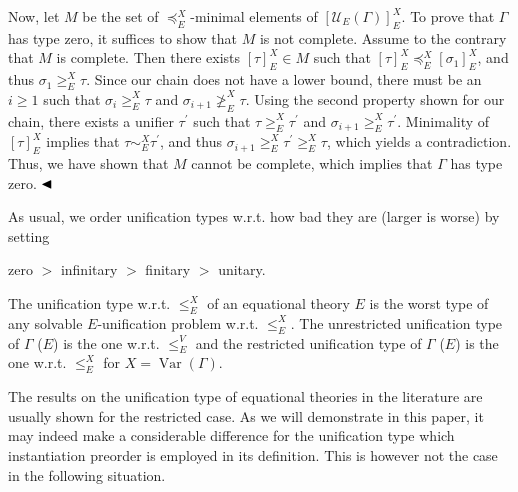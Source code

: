 \documentclass[10pt,a4paper]{amsart}
\begin{document}
 
  
Now, let $M$ be the set of $\preceq_{E}^{X}$-minimal elements of $[\mathcal{U}_{E}(\Gamma)]_{E}^{X}$. To prove that $\Gamma$ has type zero, it suffices to show that $M$ is not complete. Assume to the contrary that $M$ is complete. Then there exists $[\tau]^{X}_{E}\in M$ such that $[\tau]^{X}_{E}\preceq_{E}^{X}[\sigma_{1}]^{X}_{E}$, and thus $\sigma_{1}\geq_{E}^{X}\tau$. Since our chain does not have a lower bound, there must be an $i\geq 1$ such that $\sigma_{i}\geq_{E}^{X}\tau$ and $\sigma_{i+1}\not\geq_{E}^{X}\tau$. Using the second property shown for our chain, there exists a unifier $\tau^{\prime}$ such that $\tau\geq_{E}^{X}\tau^{\prime}$ and $\sigma_{i+1}\geq_{E}^{X}\tau^{\prime}$. Minimality of $[\tau]^{X}_{E}$ implies that $\tau\sim_{E}^{X}\tau^{\prime}$, and thus $\sigma_{i+1}\geq_{E}^{X}\tau^{\prime}\geq_{E}^{X}\tau$, which yields a contradiction. Thus, we have shown that $M$ cannot be complete, which implies that $\Gamma$ has type zero. $\hfill\blacktriangleleft$\par
 
 
 
As usual, we order unification types w.r.t. how bad they are (larger is worse) by setting\par
 
zero $>$ infinitary $>$ finitary $>$ unitary.\par
 
The unification type w.r.t. $\leq_{E}^{X}$ of an equational theory $E$ is the worst type of any solvable $E$-unification problem w.r.t. $\leq_{E}^{X}$. The unrestricted unification type of $\Gamma$ ($E$) is the one w.r.t. $\leq_{E}^{V}$ and the restricted unification type of $\Gamma$ ($E$) is the one w.r.t. $\leq_{E}^{X}$ for $X=\operatorname{Var}(\Gamma)$.\par
 
 
 
The results on the unification type of equational theories in the literature are usually shown for the restricted case. As we will demonstrate in this paper, it may indeed make a considerable difference for the unification type which instantiation preorder is employed in its definition. This is however not the case in the following situation.\par
 
\end{document}
